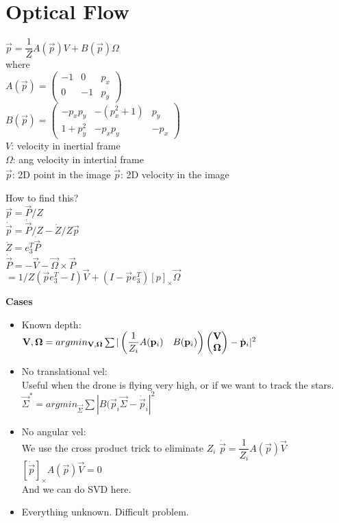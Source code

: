 \section{Optical Flow}
$\vec{p} = \dfrac{1}{Z} A(\vec{p}) V + B(\vec{p}) \Omega$\\
where \\
$A(\vec{p}) = \begin{pmatrix}
  -1 & 0 & p_x \\ 0 & -1 & p_y
\end{pmatrix}$\\
$B(\vec{p}) = \begin{pmatrix}
  -p_x p_y & -(p_x^2 +1) & p_y \\
  1 + p_y^2 & -p_x p_y & -p_x
\end{pmatrix}$\\
$V$: velocity in \alert{inertial frame}\\
$\Omega$: ang velocity in \alert{intertial frame}\\
$\vec{p}$: 2D point in the image
$\dot{\vec{p}}$: 2D velocity in the image

How to find this?\\
$\vec{p} = \vec{P}/Z$\\
$\dot{\vec{p}} = \dot{\vec{P}}/Z - \dot{Z}/Z \vec{p}$\\
$\dot{Z} = e_3^T \dot{\vec{P}}$\\
$\dot{\vec{P}} = - \vec{V} - \vec{\Omega} \times \vec{P}$\\
$=1/Z ( \vec{p} e_3^T - I) \vec{V} + (I - \vec{p} e_3^T)[p]_\times
\vec{\Omega}$

\textbf{Cases}
\begin{itemize}
  \item Known depth:\\
    $\vec{V}, \vec{\Omega} = argmin_{\vec{V}, \vec{\Omega}}\\
    \sum |\begin{pmatrix} \dfrac{1}{Z_i} A(\vec{p}_i) &
    B(\vec{p}_i)\end{pmatrix} 
    \begin{pmatrix}
      \vec{V}\\\vec{\Omega}
    \end{pmatrix} - \dot{\vec{p}}_i|^2$
  \item No translational vel:\\
    \alert{Useful when the drone is flying very high, or if we want to
    track the stars}.\\
    $\vec{\Sigma}^* = argmin_{\vec{\Sigma}}
    \sum |B(\vec{p}_i \vec{\Sigma} - \dot{\vec{p}}_i|^2$
  \item No angular vel:\\
    \alert{We use the cross product trick to eliminate $Z_i$}
    $\dot{\vec{p}} = \dfrac{1}{Z_i} A(\vec{p}) \vec{V}$\\
    $[\dot{\vec{p}}]_{\times} A(\vec{p}) \vec{V} = 0$\\
    And we can do SVD here.
  \item Everything unknown. Difficult problem.
\end{itemize}
